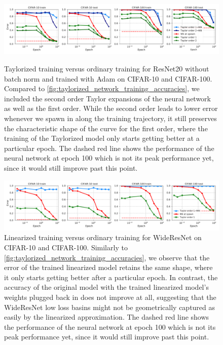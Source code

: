 \documentclass{article}
\begin{document}
%
%
\begin{figure}[ht]
\centering

\includegraphics[width=1.0\linewidth]{figures/JAX_ResNet20v1_taylorized_training_accuracies_77436176.pdf}
\caption{Taylorized training versus ordinary training for ResNet20 without batch norm and trained with Adam on CIFAR-10 and CIFAR-100. Compared to \cref{fig:taylorized_network_training_accuracies}, we included the second order Taylor expansions of the neural network as well as the first order. While the second order leads to lower error whenever we spawn in along the training trajectory, it still preserves the characteristic shape of the curve for the first order, where the training of the Taylorized model only starts getting better at a particular epoch. The dashed red line shows the performance of the neural network at epoch 100 which is not its peak performance yet, since it would still improve past this point.}
\label{fig:taylor_adam_resnet}

\includegraphics[width=1.0\linewidth]{figures/v2_JAX_BN_WideResNet_taylorized_training_accuracies_35966158.pdf}
\caption{Linearized training versus ordinary training for WideResNet on CIFAR-10 and CIFAR-100. Similarly to \cref{fig:taylorized_network_training_accuracies}, we observe that the error of the trained linearized model retains the same shape, where it only starts getting better after a particular epoch. In contrast, the accuracy of the original model with the trained linearized model's weights plugged back in does not improve at all, suggesting that the WideResNet low loss basins might not be geometrically captured as easily by the linearized approximation. The dashed red line shows the performance of the neural network at epoch 100 which is not its peak performance yet, since it would still improve past this point.}
\label{fig:taylor_WRN}

\end{figure}
\end{document}
